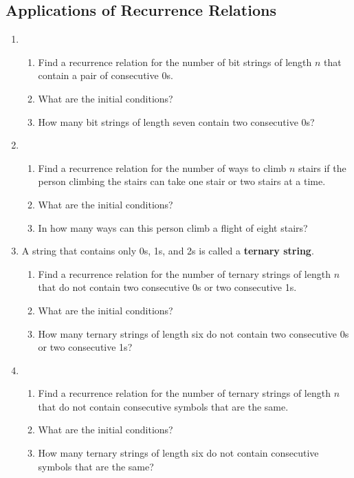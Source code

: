 \documentclass{../../cls/sig-alternate-05-2015}
\begin{document}
\subsection{Applications of Recurrence Relations}
\begin{enumerate}
\item \begin{enumerate}
	\item Find a recurrence relation for the number of bit strings
	of length $n$ that contain a pair of consecutive $0$s.
	\item What are the initial conditions?
	\item How many bit strings of length seven contain two
	consecutive $0$s?
\end{enumerate}

\item \begin{enumerate}
	\item Find a recurrence relation for the number of ways to
	climb $n$ stairs if the person climbing the stairs can take
	one stair or two stairs at a time.
	\item What are the initial conditions?
	\item In how many ways can this person climb a flight of
	eight stairs?
\end{enumerate}
	
\item A string that contains only 0s, 1s, and 2s is called a \textbf{ternary string}. \begin{enumerate}
    \item Find a recurrence relation for the number of ternary
    strings of length $n$ that do not contain two consecutive
    0s or two consecutive 1s.
    \item What are the initial conditions?
    \item How many ternary strings of length six do not contain
    two consecutive 0s or two consecutive 1s?
\end{enumerate}

\item \begin{enumerate}
    \item Find a recurrence relation for the number of ternary
    strings of length $n$ that do not contain consecutive
    symbols that are the same.
    \item What are the initial conditions?
    \item How many ternary strings of length six do not contain
    consecutive symbols that are the same?
\end{enumerate}


\end{enumerate}
\end{document}
